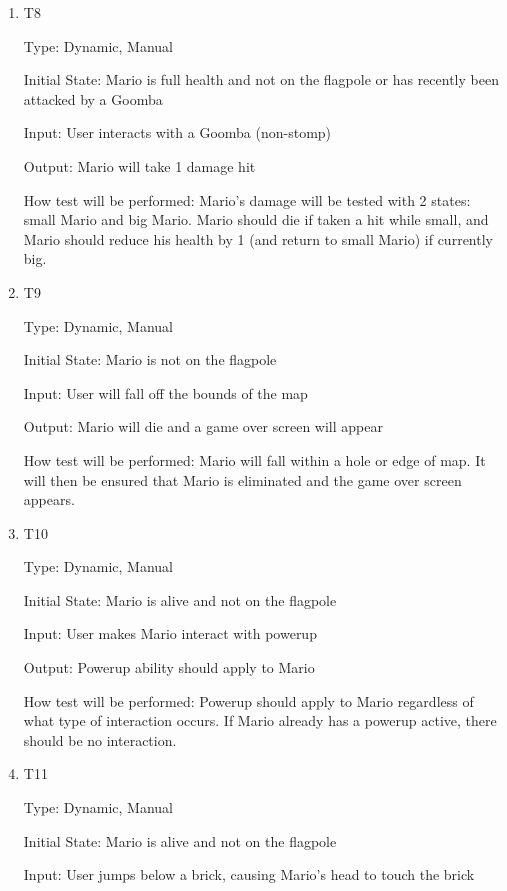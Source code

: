 \documentclass[12pt, titlepage]{article}
\begin{document}
\begin{enumerate}
\item{T8\\}

Type: Dynamic, Manual
					
Initial State: Mario is full health and not on the flagpole or has recently been attacked by a Goomba
					
Input: User interacts with a Goomba (non-stomp)
					
Output: Mario will take 1 damage hit
					
How test will be performed: Mario's damage will be tested with 2 states: small Mario and big Mario. Mario should die if taken a hit while small, and Mario should reduce his health by 1 (and return to small Mario) if currently big.

\item{T9\\}

Type: Dynamic, Manual
					
Initial State: Mario is not on the flagpole
					
Input: User will fall off the bounds of the map
					
Output: Mario will die and a game over screen will appear
					
How test will be performed: Mario will fall within a hole or edge of map. It will then be ensured that Mario is eliminated and the game over screen appears.

\item{T10\\}

Type: Dynamic, Manual
					
Initial State: Mario is alive and not on the flagpole
					
Input: User makes Mario interact with powerup
					
Output: Powerup ability should apply to Mario
					
How test will be performed: Powerup should apply to Mario regardless of what type of interaction occurs. If Mario already has a powerup active, there should be no interaction.

\item{T11\\}

Type: Dynamic, Manual
					
Initial State: Mario is alive and not on the flagpole
					
Input: User jumps below a brick, causing Mario's head to touch the brick
					

\end{enumerate}
\end{document}
